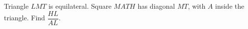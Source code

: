 Triangle $ LMT $ is equilateral. Square $ MATH $ has diagonal $ MT $, with $ A $ inside the triangle. Find $\dfrac{HL}{AL}$.
